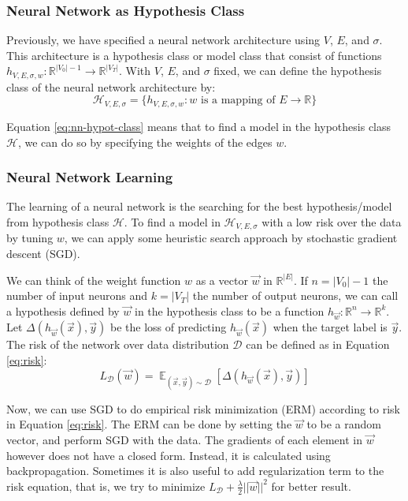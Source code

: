   \subsubsection{Neural Network as Hypothesis Class}
  Previously, we have specified a neural network architecture using $V$, $E$, and $\sigma$.
  This architecture is a hypothesis class or model class that consist of functions $h_{V,E,\sigma,w} : \mathbb{R}^{|V_0|-1} \rightarrow \mathbb{R}^{|V_T|}$.
  With $V$, $E$, and $\sigma$ fixed, we can define the hypothesis class of the neural network architecture by:
  \begin{equation}
    \mathcal{H}_{V,E,\sigma} = \{h_{V,E,\sigma,w} : w \text{ is a mapping of } E \rightarrow \mathbb{R} \}
    \label{eq:nn-hypot-class}
  \end{equation}

  Equation \ref{eq:nn-hypot-class} means that to find a model in the hypothesis class $\mathcal{H}$, we can do so by specifying the
  weights of the edges $w$.
  
  \subsubsection{Neural Network Learning}
  The learning of a neural network is the searching for the best hypothesis/model from hypothesis class $\mathcal{H}$.
  To find a model in $\mathcal{H}_{V,E,\sigma}$ with a low risk over the data by tuning $w$, we can apply
  some heuristic search approach by stochastic gradient descent (SGD).

  We can think of the weight function $w$ as a vector $\vec{w}$ in $\mathbb{R}^{|E|}$.
  If $n=|V_0|-1$ the number of input neurons and $k=|V_T|$ the number of output neurons,
  we can call a hypothesis defined by $\vec{w}$ in the hypothesis class to be a function $h_{\vec{w}} : \mathbb{R}^n \rightarrow \mathbb{R}^k$.
  Let $\Delta(h_{\vec{w}}(\vec{x}),\vec{y}) $ be the loss of predicting $h_{\vec{w}}(\vec{x})$ when the target label is $\vec{y}$.
  The risk of the network over data distribution $\mathcal{D}$ can be defined as in Equation \ref{eq:risk}:
  \begin{equation}
    L_{\mathcal{D}}(\vec{w}) = \mathop{{}\mathbb{E}}_{(\vec{x},\vec{y}) \sim \mathcal{D}} [\Delta(h_{\vec{w}}(\vec{x}),\vec{y})]
    \label{eq:risk}
  \end{equation}

  Now, we can use SGD to do empirical risk minimization (ERM) according to risk in Equation \ref{eq:risk}.
  The ERM can be done by setting the $\vec{w}$ to be a random vector, and perform SGD with the data.
  The gradients of each element in $\vec{w}$ however does not have a closed form. Instead, it is calculated using backpropagation.
  Sometimes it is also useful to add regularization term to the risk equation, that is, we try to minimize
  $L_{\mathcal{D}} + \frac{\lambda}{2} ||\vec{w}||^2$ for better result.


